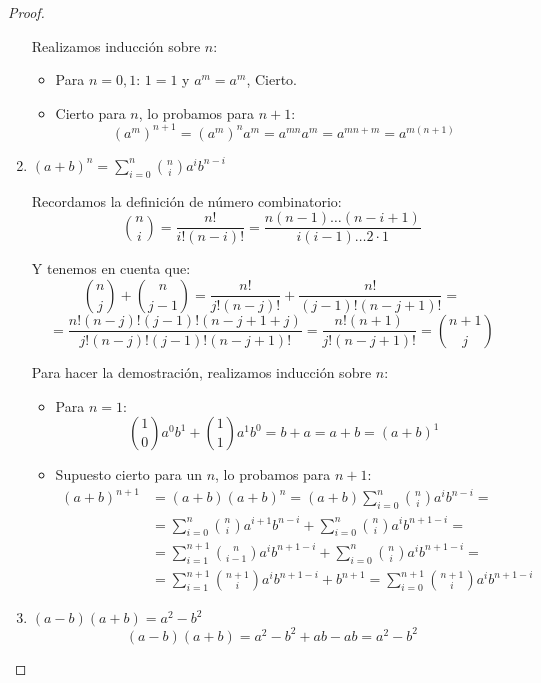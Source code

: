 \begin{proof}
\begin{enumerate}
        Realizamos inducción sobre $n$:
        \begin{itemize}
            \item Para $n=0,1$: $1=1$ y $a^m = a^m$, Cierto.
            \item Cierto para $n$, lo probamos para $n+1$:
            $$(a^m)^{n+1} = (a^m)^n a^m = a^{mn}a^m = a^{mn+m} = a^{m(n+1)}$$
        \end{itemize}

        \item $(a+b)^n = \sum\limits_{i=0}^n \binom{n}{i} a^i b^{n-i}$
        
        Recordamos la definición de número combinatorio: $$\binom{n}{i} = \dfrac{n!}{i!(n-i)!} = \dfrac{n(n-1)\ldots (n-i+1)}{i(i-1)\ldots 2 \cdot 1}$$
        
        Y tenemos en cuenta que:
        $$\binom{n}{j} + \binom{n}{j-1} = \dfrac{n!}{j!(n-j)!} + \dfrac{n!}{(j-1)!(n-j+1)!} =$$ $$=\dfrac{n!(n-j)!(j-1)!(n-j+1+j)} {j!(n-j)!(j-1)!(n-j+1)!} = \dfrac{n!(n+1)}{j!(n-j+1)!} = \binom{n+1}{j}$$

    
        Para hacer la demostración, realizamos inducción sobre $n$:
        \begin{itemize}
            \item Para $n=1$:
            $$\binom{1}{0}a^0b^1 + \binom{1}{1}a^1b^0 = b+a = a+b = (a+b)^1$$

            \item Supuesto cierto para un $n$, lo probamos para $n+1$:
            \begin{equation*}
                \begin{split}
                    (a+b)^{n+1} &= (a+b)(a+b)^n = (a+b)\sum_{i=0}^n\binom{n}{i}a^i b^{n-i} = \\
                    & = \sum_{i=0}^n \binom{n}{i} a^{i+1}b^{n-i} + \sum_{i=0}^n \binom{n}{i} a^i b^{n+1-i} = \\
                    & =\sum_{i=1}^{n+1} \binom{n}{i-1} a^i b^{n+1-i} + \sum_{i=0}^n \binom{n}{i} a^i b^{n+1-i} = \\
                    & = \sum_{i=1}^{n+1} \binom{n+1}{i} a^i b^{n+1-i} + b^{n+1} = \sum_{i=0}^{n+1}\binom{n+1}{i} a^i b^{n+1-i}
                \end{split}
            \end{equation*}
        \end{itemize}
        
        \item $(a-b) (a+b) = a^2-b^2$
        $$(a-b)(a+b) = a^2 -b^2 +ab - ab = a^2 - b^2$$
    \end{enumerate}   
\end{proof}

